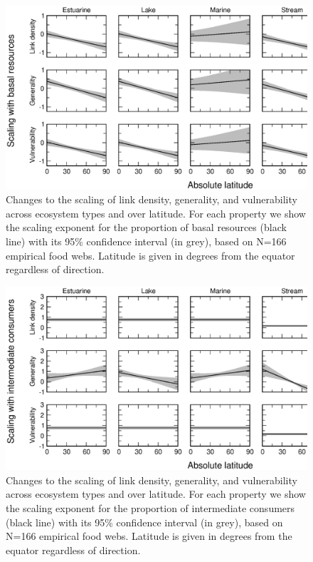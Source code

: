 \documentclass[12pt]{article}
\begin{document}
\begin{figure}[!h]
\centerline{\includegraphics*[width=.8\textwidth]{Figures/by_TL/marginal/B_marginal_latitude_proportions.eps}}
\caption{Changes to the scaling of link density, generality, and vulnerability across ecosystem
types and over latitude. For each property we show the scaling exponent for the proportion of
basal resources (black line) with its 95\% confidence interval (in grey), based on N=166 
empirical food webs. Latitude is given in degrees
from the equator regardless of direction.}
\label{B}
\end{figure}

\newpage


\begin{figure}[h]
\centerline{\includegraphics*[width=.8\textwidth]{Figures/by_TL/marginal/I_marginal_latitude_proportions.eps}}
\caption{Changes to the scaling of link density, generality, and vulnerability across ecosystem
types and over latitude. For each property we show the scaling exponent for the proportion of
intermediate consumers (black line) with its 95\% confidence interval (in grey), based on 
N=166 empirical food webs. Latitude is given in degrees
from the equator regardless of direction.}
\label{I}
\end{figure}
\end{document}
